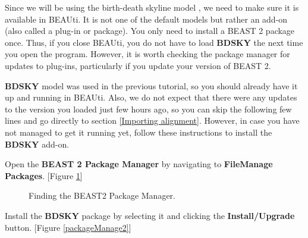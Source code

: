 \documentclass[11pt]{article}
\begin{document}
Since we will be using the birth-death skyline model \citep{Stadler2013}, we need to make sure it is available in BEAUti. It is not one of the default models but rather an add-on (also called a plug-in or package). You only need to install a BEAST 2 package once. Thus, if you close BEAUti, you do not have to load \textbf{BDSKY} the next time you open the program. However, it is worth checking the package manager for updates to plug-ins, particularly if you update your version of BEAST 2.

\textbf{BDSKY} model was used in the previous tutorial, so you should already have it up and running in BEAUti. Also, we do not expect that there were any updates to the version you loaded just few hours ago, so you can skip the following few lines and go directly to section \ref{Importing alignment}. However, in case you have not managed to get it running yet, follow these instructions to install the \textbf{BDSKY} add-on. 

\begin{framed}
Open the \textbf{BEAST 2 Package Manager} by navigating to \textbf{File\textrightarrow Manage Packages}. [Figure \ref{packageManage1}]
\end{framed}

\begin{figure}[h!]
\centering
{}
\caption{\small Finding the BEAST2 Package Manager.}
\label{packageManage1}
\end{figure}

\begin{framed}
Install the \textbf{BDSKY} package by selecting it and clicking the \textbf{Install/Upgrade} button. [Figure \ref{packageManage2}]
\end{framed}
\end{document}
